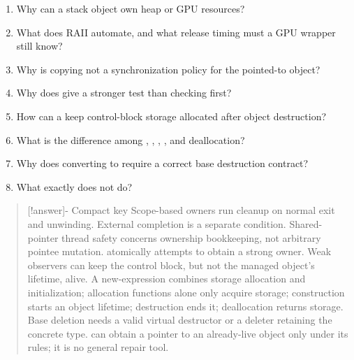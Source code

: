 \begin{enumerate}
\def\labelenumi{\arabic{enumi}.}
\tightlist
\item
  Why can a stack object own heap or GPU resources?
\item
  What does RAII automate, and what release timing must a GPU wrapper still know?
\item
  Why is  copying not a synchronization policy for the pointed-to object?
\item
  Why does  give a stronger test than checking  first?
\item
  How can a  keep control-block storage allocated after object destruction?
\item
  What is the difference among , , , , and deallocation?
\item
  Why does  converting to  require a correct base destruction contract?
\item
  What exactly does  not do?
\end{enumerate}

\begin{quote}
{[}!answer{]}- Compact key Scope-based owners run cleanup on normal exit and unwinding. External completion is a separate condition. Shared-pointer thread safety concerns ownership bookkeeping, not arbitrary pointee mutation.  atomically attempts to obtain a strong owner. Weak observers can keep the control block, but not the managed object's lifetime, alive. A new-expression combines storage allocation and initialization; allocation functions alone only acquire storage; construction starts an object lifetime; destruction ends it; deallocation returns storage. Base deletion needs a valid virtual destructor or a deleter retaining the concrete type.  can obtain a pointer to an already-live object only under its rules; it is no general repair tool.
\end{quote}


